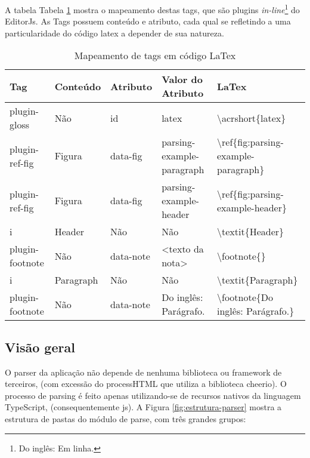A tabela
Tabela \ref{tbl:plugins-latex-mapping}
mostra o mapeamento destas tags, que são plugins
\textit{in-line}\footnote{Do inglês: Em linha.
}
do EditorJs. As Tags possuem conteúdo e atributo, cada qual se
refletindo a uma particularidade do código
\acrshort{latex}
a depender de sua natureza.

\begin{table}[H]
    \centering
    \caption{Mapeamento de tags em código LaTex}
    \label{tbl:plugins-latex-mapping}
    \renewcommand{\arraystretch}{1.5}
    \begin{tabular}{p{1.9200cm} p{1.9200cm} p{1.9200cm} p{3.2000cm} p{7.0400cm}}
        \hline
        \textbf{Tag} & \textbf{Conteúdo} & \textbf{Atributo} & \textbf{Valor do Atributo} & \textbf{LaTex} \\
        \hline
        plugin-gloss & Não & id & latex & \textbackslash acrshort\{latex\} \\
		plugin-ref-fig & Figura & data-fig & parsing-example-paragraph & \textbackslash ref\{fig:parsing-example-paragraph\} \\
		plugin-ref-fig & Figura & data-fig & parsing-example-header & \textbackslash ref\{fig:parsing-example-header\} \\
		i & Header & Não & Não & \textbackslash textit\{Header\} \\
		plugin-footnote & Não & data-note & <texto da nota> & \textbackslash footnote\{<texto da nota>\} \\
		i & Paragraph & Não & Não & \textbackslash textit\{Paragraph\} \\
		plugin-footnote & Não & data-note & Do inglês: Parágrafo. & \textbackslash footnote\{Do inglês: Parágrafo.\} \\
        \hline
        
    \end{tabular}
\end{table}

\subsection{Visão geral}

O parser da aplicação não depende de nenhuma biblioteca
ou framework de terceiros,
(com excessão do processHTML que utiliza a biblioteca cheerio).
O processo de parsing é feito
apenas utilizando-se de recursos nativos da linguagem
TypeScript, (consequentemente
\acrshort{js}).
A
Figura \ref{fig:estrutura-parser}
mostra a estrutura de pastas do módulo de parse, com três grandes
grupos:

